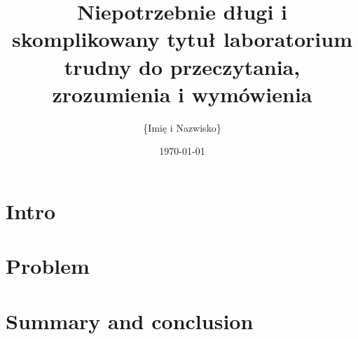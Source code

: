 \documentclass[
    left=2.5cm,         %
    right=2.5cm,        %
    top=2.5cm,          %
    bottom=3cm,         %
    bindingoffset=6mm,  %
    nohyphenation=false %
]{eiti/eiti-report}
\begin{document}
\title{
    Niepotrzebnie długi i skomplikowany tytuł laboratorium \\
    trudny do przeczytania, zrozumienia i wymówienia
}

\author{\{Imię i Nazwisko\}}
\date{\today}
\maketitle

\tableofcontents

\cleardoublepage %
\pagestyle{headings}

\newpage %
\section{Intro}     
\lipsum[1-2]
\section{Problem}
\lipsum[1-2]
\lipsum[1-1]  \cite{shs2015}
\lipsum[1-2]
\section{Summary and conclusion}  
\lipsum[1] \cite{goossens93}

\cleardoublepage %
\printbibliography



\pagestyle{plain}

\vspace{0.8cm}

\vspace{1cm}          %
\listofappendicestoc  %

\newpage
{}
\end{document}
